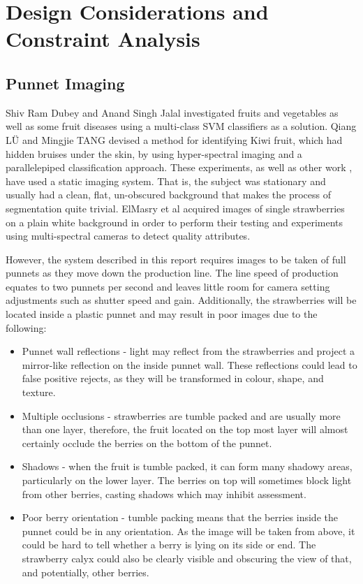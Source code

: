 \documentclass[fleqn,twoside,12pt]{report}
\begin{document}
\section{Design Considerations and Constraint Analysis}
\label{sec:challenges}

\subsection{Punnet Imaging}

Shiv Ram Dubey and Anand Singh Jalal \cite{shiv} investigated fruits and vegetables as well as some fruit diseases using a multi-class SVM classifiers as a solution. Qiang LÜ and Mingjie TANG \cite{lu} devised a method for identifying Kiwi fruit, which had hidden bruises under the skin, by using hyper-spectral imaging and a parallelepiped classification approach. These experiments, as well as other work \cite{elmasry2,chiu}, have used a static imaging system. That is, the subject was stationary and usually had a clean, flat, un-obscured background that makes the process of segmentation quite trivial. ElMasry et al \cite{elmasry2} acquired images of single strawberries on a plain white background in order to perform their testing and experiments using multi-spectral cameras to detect quality attributes. 

However, the system described in this report requires images to be taken of full punnets as they move down the production line. The line speed of production equates to two punnets per second and leaves little room for camera setting adjustments such as shutter speed and gain. Additionally, the strawberries will be located inside a plastic punnet and may result in poor images due to the following:  

\begin{itemize}
	\item Punnet wall reflections - light may reflect from the strawberries and project a mirror-like reflection on the inside punnet wall. These reflections could lead to false positive rejects, as they will be transformed in colour, shape, and texture.
	\item Multiple occlusions - strawberries are tumble packed and are usually more than one layer, therefore, the fruit located on the top most layer will almost certainly occlude the berries on the bottom of the punnet. 
	\item Shadows - when the fruit is tumble packed, it can form many shadowy areas, particularly on the lower layer. The berries on top will sometimes block light from other berries, casting shadows which may inhibit assessment.
	\item Poor berry orientation - tumble packing means that the berries inside the punnet could be in any orientation. As the image will be taken from above, it could be hard to tell whether a berry is lying on its side or end. The strawberry calyx could also be clearly visible and obscuring the view of that, and potentially, other berries. 
\end{itemize}
\end{document}
